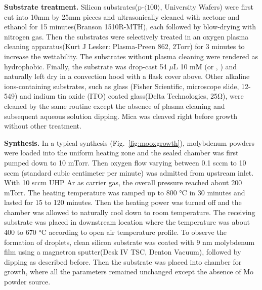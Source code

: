 \textbf{Substrate treatment.} Silicon substrates(p-$\langle100\rangle$, University Wafers) were first cut into 10mm by 25mm pieces and ultrasonically cleaned with acetone and ethanol for 15 minutes(Branson 1510R-MTH), each followed by blow-drying with nitrogen gas. Then the substrates were selectively treated in an oxygen plasma cleaning apparatus(Kurt J Lesker: Plasma-Preen 862, 2Torr) for 3 minutes to increase the wettability. The substrates without plasma cleaning were rendered as hydrophobic. Finally, the substrate was drop-cast 54 $\mu$L 10 mM  (or , ) and naturally left dry in a convection hood with a flask cover above. Other alkaline ions-containing substrates, such as glass (Fisher Scientific, microscope slide, 12-549) and indium tin oxide (ITO) coated glass(Delta Technologies, 25\si{\ohm}), were cleaned by the same routine except the absence of plasma cleaning and subsequent aqueous solution dipping. Mica was cleaved right before growth without other treatment.

\textbf{Synthesis.} In a typical synthesis (Fig.~\ref{fig:mooxgrowth}), molybdenum powders were loaded into the uniform heating zone and the sealed chamber was first pumped down to 10 mTorr. Then oxygen flow varying between 0.1 sccm to 10 sccm (standard cubic centimeter per minute) was admitted from upstream inlet. With 10 sccm UHP Ar as carrier gas, the overall pressure reached about 200 mTorr. The heating temperature was ramped up to 800 \si{\degreeCelsius} in 30 minutes and lasted for 15 to 120 minutes. Then the heating power was turned off and the chamber was allowed to naturally cool down to room temperature. The receiving substrate was placed in downstream location where the temperature was about 400 to 670 \si{\degreeCelsius} according to open air temperature profile. To observe the formation of droplets, clean silicon substrate was coated with 9 nm molybdenum film using a magnetron sputter(Desk IV TSC, Denton Vacuum), followed by  dipping as described before. Then the substrate was placed into chamber for growth, where all the parameters remained unchanged except the absence of Mo powder source.

